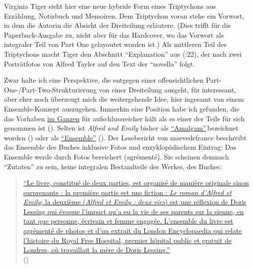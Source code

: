 \documentclass[fontsize=12pt]{scrartcl}
\begin{document}
Virginia Tiger sieht \mbox{hier} eine neue hybride Form eines Triptychons aus Erz\"ahlung, Notizbuch und Memoiren. Dem Triptychon voran stehe ein Vorwort, in dem die Autorin\textsuperscript{\tiny *} die Absicht der Dreiteilung erl\"autere. (Dies trifft f\"ur die Paperback-Ausga\-be zu, nicht aber f\"ur das Hardcover, wo das Vorwort als integraler Teil von Part One gelayoutet worden ist.) Als mittleren Teil des Triptychons macht Tiger den Abschnitt "`Explanation"' aus (\cite{Tiger2009}:22), der nach zwei Portr\"atfotos von Alfred Tayler auf den Text der "`novella"' folgt.

Zwar halte ich eine Perspektive, die entgegen einer offensichtlichen Part-One-/Part-Two-Strukturierung von einer Dreiteilung ausgeht, f\"ur interessant, aber eher noch \"uberzeugt mich die weitergehende Idee, \mbox{hier} ingesamt von einem Ensemble-Konzept auszugehen. Immerhin eine Position habe ich gefunden, die das Vorhaben \href{http://www.nytimes.com/2008/08/10/books/review/James-t.html}{im Ganzen} f\"ur aufschlussreicher h\"alt als es einer der Teile f\"ur sich genommen ist (\cite{James2008}). Selten ist \textit{Alfred and Emily} bis\-her als \href{http://www.oxonianreview.org/wp/stories-to-herself/}{"`Amalgam"'}\,be\-zeichnet\,worden (\cite{Sergeant2008}) oder als \href{http://www.babelio.com/livres/Lessing-Alfred-et-Emily/84706/critiques/621555}{"`Ensemble"'} (\cite{maevedefrance2014}). Der Lesebericht von maevedefrance beschreibt das Ensemble des Buches inklusive Fotos und en\-zy\-klo\-p\"a\-di\-schem Eintrag: Das Ensemble werde durch Fotos be\-rei\-chert (agr\'{e}ment\'{e}). Sie scheinen demnach "`Zutaten"' zu sein, keine integralen Bestandteile des Werkes, des Buches: 

\singlespacing
\begin{quote}
\href{http://www.babelio.com/livres/Lessing-Alfred-et-Emily/84706/critiques/621555}{"`Le livre, constitu\'{e} de deux parties, est organis\'{e} de mani\`{e}re originale sinon surprenante : la premi\`{e}re partie est une fiction : \textit{Le roman d'Alfred et Emily}; la deuxi\`{e}me (\textit{Alfred et Emily : deux vies}) est une r\'{e}flexion de Doris Lessing qui \'{e}voque l'impact qu'a eu la vie de ses parents sur la sienne, en tant que personne, \'{e}crivain et femme engag\'{e}e. L'ensemble du livre est agr\'{e}ment\'{e} de photos et d'un extrait du London Encyclopaedia qui relate l'histoire du Royal Free Hospital, premier h\^{o}pital public et gratuit de Londres, o\`{u} travaillait la m\`{e}re de Doris Lessing."'}\\ (\cite{maevedefrance2014}) 
\end{quote} 
\onehalfspacing
\end{document}
